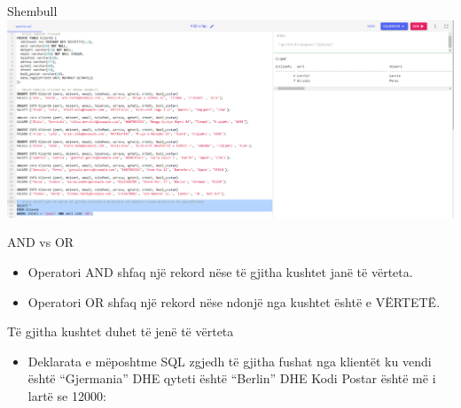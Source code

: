 \documentclass[
  ignorenonframetext,
]{beamer}
\providecommand{\tightlist}{%
  \setlength{\itemsep}{0pt}\setlength{\parskip}{0pt}}
\begin{document}
\begin{frame}{Shembull}
\label{shembull-23}
\includegraphics{./Figs/query14.png}
\end{frame}

\begin{frame}{AND vs OR}
\label{and-vs-or}
\begin{itemize}
\item
  Operatori AND shfaq një rekord nëse të gjitha kushtet janë të vërteta.
\item
  Operatori OR shfaq një rekord nëse ndonjë nga kushtet është e VËRTETË.
\end{itemize}
\end{frame}

\begin{frame}{Të gjitha kushtet duhet të jenë të vërteta}
\label{tuxeb-gjitha-kushtet-duhet-tuxeb-jenuxeb-tuxeb-vuxebrteta}
\begin{itemize}
\tightlist
\item
  Deklarata e mëposhtme SQL zgjedh të gjitha fushat nga klientët ku
  vendi është ``Gjermania'' DHE qyteti është ``Berlin'' DHE Kodi Postar
  është më i lartë se 12000:
\end{itemize}
\end{frame}
\end{document}
